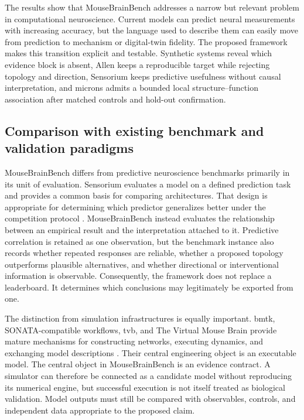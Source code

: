 \documentclass[a4paper,fleqn]{cas-sc}
\begin{document}
The results show that MouseBrainBench addresses a narrow but relevant problem in
computational neuroscience. Current models can predict neural measurements with
increasing accuracy, but the language used to describe them can easily move from
prediction to mechanism or digital-twin fidelity. The proposed framework makes
this transition explicit and testable. Synthetic systems reveal which evidence
block is absent, Allen keeps a reproducible target while rejecting topology and
direction, Sensorium keeps predictive usefulness without causal interpretation,
and \acs{microns} admits a bounded local structure--function association after
matched controls and hold-out confirmation.

\subsection{Comparison with existing benchmark and validation paradigms}
\label{subsec:benchmark-comparison}

MouseBrainBench differs from predictive neuroscience benchmarks primarily in
its unit of evaluation. Sensorium evaluates a model on a defined prediction
task and provides a common basis for comparing architectures. That design is
appropriate for determining which predictor generalizes better under the
competition protocol \citep{willeke2022sensorium,turishcheva2023dynamic}.
MouseBrainBench instead evaluates the relationship between an empirical result
and the interpretation attached to it. Predictive correlation is retained as
one observation, but the benchmark instance also records whether repeated
responses are reliable, whether a proposed topology outperforms plausible
alternatives, and whether directional or interventional information is
observable. Consequently, the framework does not replace a leaderboard. It
determines which conclusions may legitimately be exported from one.

The distinction from simulation infrastructures is equally important. \acs{bmtk},
SONATA-compatible workflows, \acs{tvb}, and The Virtual Mouse Brain
provide mature mechanisms for constructing networks, executing dynamics, and
exchanging model descriptions \citep{dai2020bmtk,tvb2013,melozzi2017virtualmouse}.
Their central engineering object is an executable model. The central object in
MouseBrainBench is an evidence contract. A simulator can therefore be connected
as a candidate model without reproducing its numerical engine, but successful
execution is not itself treated as biological validation. Model outputs must
still be compared with observables, controls, and independent data appropriate
to the proposed claim.
\end{document}
